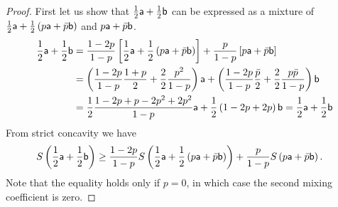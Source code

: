 \begin{proof}
	First let us show that $\frac{1}{2} \ens[a] + \frac{1}{2} \ens[b]$ can be expressed as a mixture of $\frac{1}{2} \ens[a] + \frac{1}{2}\left(p\ens[a] + \bar{p} \ens[b]\right)$ and $p\ens[a] + \bar{p} \ens[b]$.
	\begin{equation}
		\begin{aligned}
			\frac{1}{2} \ens[a] + \frac{1}{2} \ens[b] &=  \frac{1-2p}{1-p}\left[\frac{1}{2} \ens[a] + \frac{1}{2}\left(p\ens[a] + \bar{p} \ens[b]\right)\right] + \frac{p}{1-p}\left[p\ens[a] + \bar{p} \ens[b]\right] \\
			&= \left( \frac{1-2p}{1-p} \frac{1+p}{2} + \frac{2}{2} \frac{p^2}{1-p} \right) \ens[a] + \left( \frac{1-2p}{1-p} \frac{\bar{p}}{2}+ \frac{2}{2} \frac{p\bar{p}}{1-p} \right) \ens[b] \\
			&= \frac{1}{2} \frac{1-2p + p - 2p^2 + 2p^2}{1-p} \ens[a] + \frac{1}{2}\left(1-2p+2p\right) \ens[b] = \frac{1}{2} \ens[a] + \frac{1}{2} \ens[b]
		\end{aligned}
	\end{equation}
	From strict concavity we have
	\begin{equation}
	\begin{aligned}
		S\left(\frac{1}{2} \ens[a] + \frac{1}{2} \ens[b] \right) &\geq  \frac{1-2p}{1-p}S\left(\frac{1}{2} \ens[a] + \frac{1}{2}\left(p\ens[a] + \bar{p} \ens[b]\right)\right) + \frac{p}{1-p} S\left(p\ens[a] + \bar{p} \ens[b]\right).
	\end{aligned}
\end{equation}
	Note that the equality holds only if $p=0$, in which case the second mixing coefficient is zero.
	

\end{proof}
